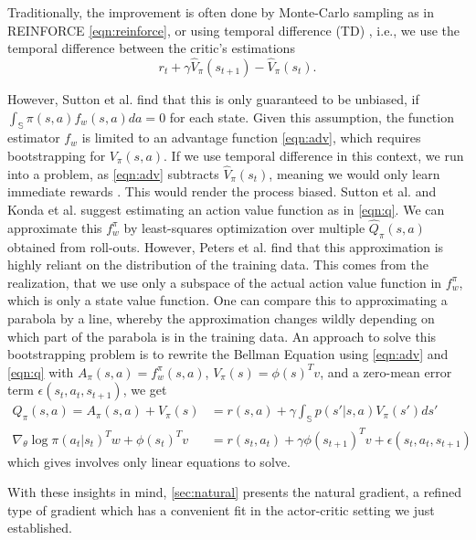 Traditionally, the improvement is often done by Monte-Carlo sampling as in REINFORCE \eqref{eqn:reinforce}, or using temporal difference (TD) \cite{Sutton1988}, i.e., we use the temporal difference between the critic's estimations 
\begin{equation}
  r_t + \gamma \hat{V}_\pi(s_{t+1}) - \hat{V}_\pi(s_t).
\end{equation}

However, Sutton et al. \cite{1993b} find that this is only guaranteed to be unbiased, if $\int_\mathbb{S}{\pi(s,a)f_w(s,a)da} = 0$ for each state. 
Given this assumption, the function estimator $f_w$ is limited to an advantage function \eqref{eqn:adv}, which requires bootstrapping for $V_\pi(s,a)$. 
If we use temporal difference in this context, we run into a problem, as \eqref{eqn:adv} subtracts $\hat{V}_\pi(s_t)$, meaning we would only learn immediate rewards \cite{Peters_IICHR_2003}. 
This would render the process biased. 
Sutton et al. \cite{Sutton:1999:PGM:3009657.3009806} and Konda et al. \cite{NIPS1999_1786} suggest estimating an action value function as in \eqref{eqn:q}. 
We can approximate this $f_w^\pi$ by least-squares optimization over multiple $\hat{Q}_\pi(s,a)$ obtained from roll-outs. 
However, Peters et al. \cite{4863} find that this approximation is highly reliant on the distribution of the training data. 
This comes from the realization, that we use only a subspace of the actual action value function in $f_w^\pi$, which is only a state value function. 
One can compare this to approximating a parabola by a line, whereby the approximation changes wildly depending on which part of the parabola is in the training data. 
An approach to solve this bootstrapping problem is to rewrite the Bellman Equation using \eqref{eqn:adv} and \eqref{eqn:q} with $A_\pi(s,a) = f_w^\pi(s,a)$, $V_\pi(s) = \phi(s)^T v$, and a zero-mean error term $\epsilon(s_t,a_t,s_{t+1})$, we get
\begin{align}
  Q_\pi(s,a) = A_\pi(s,a) + V_\pi(s) &= r(s,a) + \gamma \int_\mathbb{S} p(s'|s,a)V_\pi(s')ds' \\
  \nabla_\theta \log \pi(a_t|s_t)^T w + \phi(s_t)^T v &= r(s_t,a_t) + \gamma \phi(s_{t+1})^T v + \epsilon(s_t,a_t,s_{t+1})
\end{align}
which gives involves only linear equations to solve. \cite{4863} 

With these insights in mind, \ref{sec:natural} presents the natural gradient, a refined type of gradient which has a convenient fit in the actor-critic setting we just established.

